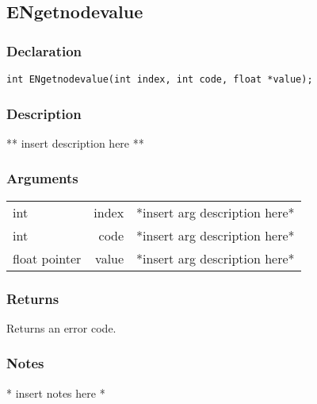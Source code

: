 \subsection{ENgetnodevalue}
\subsubsection{Declaration}
\begin{lstlisting}
int ENgetnodevalue(int index, int code, float *value);
\end{lstlisting}
\subsubsection{Description}
** insert description here **
\subsubsection{Arguments}
\begin{tabular}{l r p{11cm} }
int&index&*insert arg description here* \\[6pt]
int&code&*insert arg description here* \\[6pt]
float pointer&value&*insert arg description here* \\[6pt]
\end{tabular}
\subsubsection{Returns}
Returns an error code.
\subsubsection{Notes}
* insert notes here *